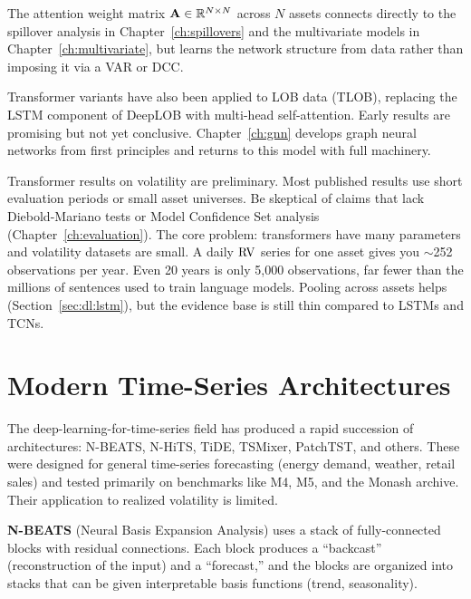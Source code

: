\begin{keyidea}
The attention weight matrix $\mathbf{A} \in \mathbb{R}^{N \times N}$ across $N$ assets connects directly to the spillover analysis in Chapter~\ref{ch:spillovers} and the multivariate models in Chapter~\ref{ch:multivariate}, but learns the network structure from data rather than imposing it via a VAR or DCC.
\end{keyidea}

Transformer variants have also been applied to LOB data (TLOB), replacing the LSTM component of DeepLOB with multi-head self-attention.
Early results are promising but not yet conclusive.
Chapter~\ref{ch:gnn} develops graph neural networks from first principles and returns to this model with full machinery.

\begin{warning}
Transformer results on volatility are preliminary.
Most published results use short evaluation periods or small asset universes.
Be skeptical of claims that lack Diebold-Mariano tests or Model Confidence Set analysis (Chapter~\ref{ch:evaluation}).
The core problem: transformers have many parameters and volatility datasets are small.
A daily $\operatorname{RV}$ series for one asset gives you $\sim$252 observations per year.
Even 20 years is only 5,000 observations, far fewer than the millions of sentences used to train language models.
Pooling across assets helps (Section~\ref{sec:dl:lstm}), but the evidence base is still thin compared to LSTMs and TCNs.
\end{warning}


\section{Modern Time-Series Architectures}\label{sec:dl:modern}

The deep-learning-for-time-series field has produced a rapid succession of architectures: N-BEATS, N-HiTS, TiDE, TSMixer, PatchTST, and others.
These were designed for general time-series forecasting (energy demand, weather, retail sales) and tested primarily on benchmarks like M4, M5, and the Monash archive.
Their application to realized volatility is limited.

\textbf{N-BEATS} (Neural Basis Expansion Analysis) uses a stack of fully-connected blocks with residual connections.
Each block produces a ``backcast'' (reconstruction of the input) and a ``forecast,'' and the blocks are organized into stacks that can be given interpretable basis functions (trend, seasonality).

